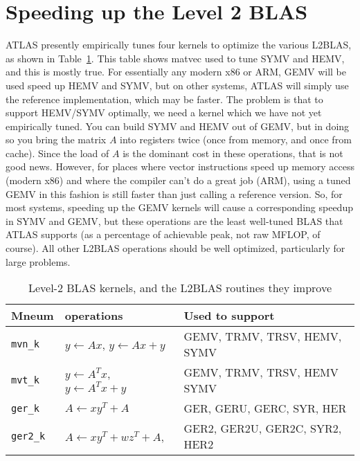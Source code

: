 \documentclass[11pt]{article}
\newcommand{\kernk}[1]{{\tt #1\_k}}
\begin{document}
\section{Speeding up the Level 2 BLAS}

ATLAS presently empirically tunes four kernels to optimize the various
L2BLAS, as shown in Table~\ref{tab-l2k}.
This table shows matvec used to tune SYMV and HEMV, and this is mostly
true.  For essentially any modern x86 or ARM, GEMV will be used speed up
HEMV and SYMV, but on other systems, ATLAS will simply use the reference
implementation, which may be faster.  The problem is that to support
HEMV/SYMV optimally, we need a kernel which we have not yet
empirically tuned.  You can build SYMV and HEMV out of GEMV, but in
doing so you bring the matrix $A$ into registers twice (once from
memory, and once from cache).  Since the load of $A$ is the dominant
cost in these operations, that is not good news.  However, for places
where vector instructions speed up memory access (modern x86) and where
the compiler can't do a great job (ARM), using a tuned GEMV in this
fashion is still faster than just calling a reference version.  So,
for most systems, speeding up the GEMV kernels will cause a corresponding
speedup in SYMV and GEMV, but these operations are the least well-tuned
BLAS that ATLAS supports (as a percentage of achievable peak, not raw
MFLOP, of course).  All other L2BLAS operations should be well optimized,
particularly for large problems.


\begin{table}[thb]
\begin{center}
\begin{tabular}{lll}
Mneum & operations & Used to support \\\hline\hline
\kernk{mvn} & $y \leftarrow Ax$, $y \leftarrow Ax + y$ & GEMV, TRMV, TRSV, 
HEMV, SYMV\\\hline
\kernk{mvt} & $y \leftarrow A^Tx$, $y \leftarrow A^Tx + y$ & GEMV, TRMV, TRSV,
HEMV SYMV\\\hline
\kernk{ger} & $A \leftarrow xy^T + A$  & GER, GERU, GERC, SYR, HER \\\hline
\kernk{ger2}& $A \leftarrow xy^T + wz^T + A$, & GER2, GER2U, GER2C, SYR2, HER2
\\\hline
\end{tabular}
\end{center}
\caption{Level-2 BLAS kernels, and the L2BLAS routines they improve}
\label{tab-l2k}
\end{table}
\end{document}

